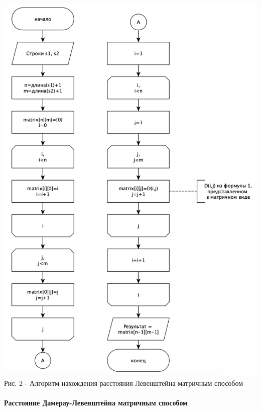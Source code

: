 \documentclass[a4paper,14pt]{article} %
\begin{document}
        \begin{center}
        		\includegraphics[scale = 0.8]{shema1} \\ Рис.  2 - Алгоритм нахождения расстояния Левенштейна матричным способом
	\end{center}
	
        \paragraph{Расстояние Дамерау-Левенштейна матричным способом}
        
\end{document}
